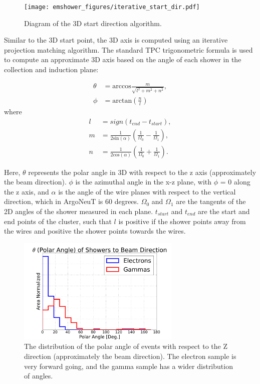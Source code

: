 \begin{figure}[h!]
  \centering
  \texttt{[image: emshower\_figures/iterative\_start\_dir.pdf]}
  \caption[Diagram of the 3D start direction algorithm.]{Diagram of the 3D start direction algorithm.}
  \label{fig:iterative_start_dir}
\end{figure}


Similar to the 3D start point, the 3D axis is computed using an iterative projection matching algorithm.  The standard TPC trigonometric formula is used to compute an approximate 3D axis based on the angle of each shower in the collection and induction plane:

\begin{align}
  \theta &= \text{arccos}\frac{m}{\sqrt{l^2 + m^2 + n^2}}, \\
  \phi &= \text{arctan}\left(\frac{n}{l}\right) 
\end{align}
where
\begin{align}
l &= sign(t_{end} - t_{start}), \\
m &= \frac{1}{2 \text{sin}(\alpha)}\left(\frac{1}{\Omega_0} - \frac{1}{\Omega_1}\right), \\
n &= \frac{1}{2 \text{cos}(\alpha)}\left(\frac{1}{\Omega_0} + \frac{1}{\Omega_1}\right).
\end{align}

Here, $\theta$ represents the polar angle in 3D with respect to the z axis (approximately the beam direction).  $\phi$ is the azimuthal angle in the x-z plane, with $\phi$ = 0 along the z axis, and  $\alpha$ is the angle of the wire planes with respect to the vertical direction, which in ArgoNeuT is 60 degrees.  $\Omega_0$ and $\Omega_1$ are the tangents of the 2D angles of the shower measured in each plane.  $t_{start}$ and $t_{end}$ are the start and end points of the cluster, such that $l$ is positive if the shower points away from the wires and positive the shower points towards the wires.

\begin{figure}[htbp]
   \centering
   \includegraphics[height=2in]{emshower_figures/theta_distribution.png}
   \caption[Angular Distributions of Electromagnetic Showers.]{The distribution of the polar angle of events with respect to the Z direction (approximately the beam direction).  The electron sample is very forward going, and the gamma sample has a wider distribution of angles. }
   \label{fig:geomety_dists}
 \end{figure} 

